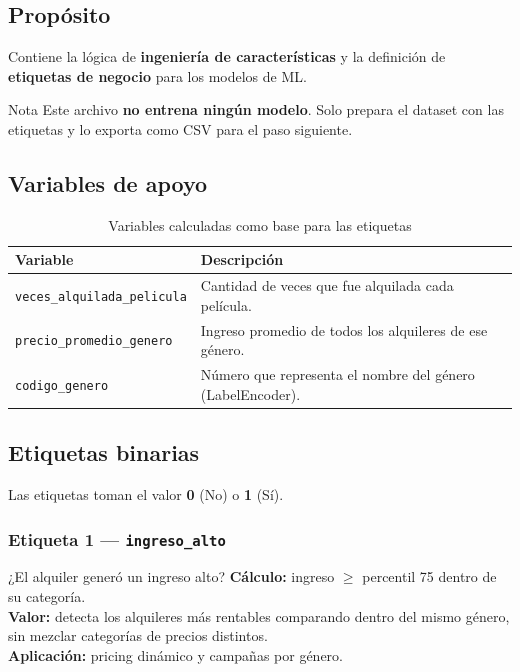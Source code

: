 \documentclass[12pt,a4paper]{article}
\begin{document}
\subsection{Prop\'osito}

Contiene la l\'ogica de \textbf{ingenier\'ia de caracter\'isticas} y la
definici\'on de \textbf{etiquetas de negocio} para los modelos de ML.

\begin{cajainfo}{Nota}
Este archivo \textbf{no entrena ning\'un modelo}. Solo prepara el dataset
con las etiquetas y lo exporta como CSV para el paso siguiente.
\end{cajainfo}

\subsection{Variables de apoyo}

\begin{table}[H]
  \centering
  \caption{Variables calculadas como base para las etiquetas}
  \begin{tabular}{lp{8cm}}
    \toprule
    \textbf{Variable}                   & \textbf{Descripci\'on} \\
    \midrule
    \texttt{veces\_alquilada\_pelicula}  & Cantidad de veces que fue alquilada cada pel\'icula. \\
    \texttt{precio\_promedio\_genero}    & Ingreso promedio de todos los alquileres de ese g\'enero. \\
    \texttt{codigo\_genero}              & N\'umero que representa el nombre del g\'enero (LabelEncoder). \\
    \bottomrule
  \end{tabular}
\end{table}

\subsection{Etiquetas binarias}

Las etiquetas toman el valor \textbf{0} (No) o \textbf{1} (S\'i).

\subsubsection{Etiqueta 1 --- \texttt{ingreso\_alto}}

\begin{cajainfo}{¿El alquiler gener\'o un ingreso alto?}
  \textbf{C\'alculo:} ingreso $\geq$ percentil 75 dentro de su categor\'ia.\\[3pt]
  \textbf{Valor:} detecta los alquileres m\'as rentables comparando
  dentro del mismo g\'enero, sin mezclar categor\'ias de precios distintos.\\[3pt]
  \textbf{Aplicaci\'on:} pricing din\'amico y campa\~nas por g\'enero.
\end{cajainfo}
\end{document}

